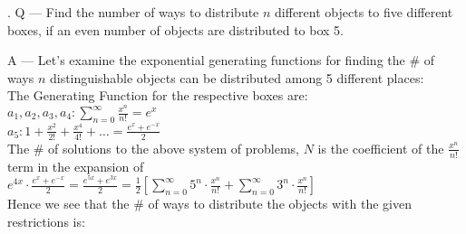 \documentclass{article}
\newcounter{question}
\begin{document}
\newcommand\Que[1]{%
   \leavevmode\par
   \stepcounter{question}
   \noindent
   \thequestion. Q --- #1\par}

\newcommand\Ans[2][]{%
    \leavevmode\par\noindent
   {\leftskip37pt
    A --- \textbf{#1}#2\par}}

\Que{
    Find the number of ways to distribute $n$ different objects 
    to five different boxes, if an even number of objects are 
    distributed to box 5.
    }
\Ans{
    Let's examine the exponential generating functions 
    for finding the \# of ways $n$ distinguishable objects
    can be distributed among 5 different places:\\

    The Generating Function for the respective boxes are:\\

    $a_1, a_2, a_3, a_4: \sum_{n=0}^{\infty}{\frac{x^n}{n!}} = e^x $\\

    $a_5: 1 + \frac{x^2}{2!} + \frac{x^4}{4!} + \dots = \frac{e^x+e^{-x}}{2} $\\

    The \# of solutions to the above system of problems, $N$
    is the coefficient of the $\frac{x^n}{n!}$ term in the expansion of\\

    $
    e^{4x} \cdot \frac{e^x+e^{-x}}{2}
    = \frac{e^{5x}+e^{3x}}{2}
    = \frac{1}{2} \left[
        \sum_{n=0}^{\infty}{5^n \cdot \frac{x^n}{n!}}
        + \sum_{n=0}^{\infty}{3^n \cdot \frac{x^n}{n!}}
    \right]
    $\\

    Hence we see that the \# of ways to distribute the
    objects with the given restrictions is:\\

    \boxed{
        \begin{aligned}
            \frac{5^n+3^n}{2}
        \end{aligned}
    }
    }
\end{document}

